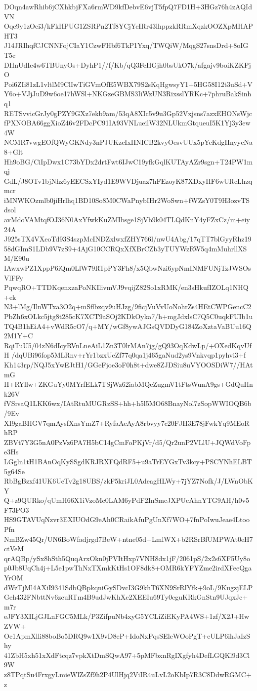 DOqn4awRhib6jCXhkbjFXa6rmWD9kfDebvE6vjT5fpQ7FD1H+3HGz76h4zAQIdVN
Oqc9y1zOci3/kFkHPUG1ZSRPn2Tf8YCjYcIRr43lhppzkRRmXqzkOOZXpMHAPHT3
J14JRIhqfCJCNNFojCIaY1CzwFHbf6TkP1Yxq/TWQiW/MqgS27snsDrd+8oIGT5c
DHnUdIe4w6TBUnyOs+DyhP1//f/Kb/qQ3FeHGjh0bsUkO7k/afgajv9boiKZKPjO
Poi6ZIi81zL1vltlM9ClIwTiGVmOfE5WBX79S2sKqHgwsyY1+5HG58I12t3uSd+V
Y6o+VJjJuD9w6oe17hWSl+NKGzeGBMS3IiWzUN3RixsslYRKc+7phruBakSinhq1
RETSvvicGrJy0gPZY9GXz7ekb9am/53qA8XIc5v9u3Gp52Vxjsns7azxEHONsWjc
fPXNOBA66ggXioZ46v2FDcPC91IA93VNLueilW32NLUkmGtqueuI5K1Yj3y3ew4W
NCMR7vwgEOfQWyGKNdy3nPJUKzcIxHNICB2kvyOesvUUx5pYeKdgHnyycNa8+Glt
Hh9oBG/CiIpDwx1C73bYDx2drtFwt6IJwC19yfkGqlKUTAyAZr9sgn+T24PW1mqj
GdL/J8OTv1bjNhz6yEECSxYIyd1E9WVDjuaz7hFEzoyK87XDxyHF6wURcLhzqmcr
iMNWKOzmlb0jiHrlhq1BD10So8M0CWaPnybIHr2WoSwn+fWZsY0T9H3ozvTSdsol
avMdoVAMtqfOJ36N0AxYfwkKuZMIbsge1SjVb9k04TLQdKnY4yFZxCz/m+eiy24A
J925sTX4VXeoTd93S4szpMcINDZxlwxfZHY766l/nwU4Abg/17qTT7blGyyRhz19
58dGImS1LDb9V7zS9+4AjG10CCRQxXfXBrCZb3yTUYWzRW5q4mMuhrllXSM/E90u
IAwxwPZ1XppP6iQm0LlW79RTpPY3Fh8/x5QbwNzi6ypNmINMFUNjTzJWSOsVlFFy
PqwqRO+TTDKqenxzaPoNKIlivmVJ9vqijZ82So1xRMK/en3sHkufIZOLq1NHQ+ek
N3+lMg/IlnWTxa3O2q+mSflbzqv9uHJzg/9ficjVuVvUoNohrZs4HEtCWPGencC2
PbZh6xOLkc5jtg8t285cK7XCT9aSOj2KDkOyka7/h+mgJdxlsC7Q5C0uqkFUIb1u
TQ4B1hEiA4+vWdR5cO7/q+MY/wGf8ywAJGsQVDDyG184ZoXztaVaBUu16Q2M1Y+C
RqiTuU5/04zN6dIcyRVnLneAiL1Zn3T0lrMAn7jg/gQ93OqKdwLp/+OXedKqvUfH
/dqUBi96fop5MLRnv+rYr1bzxUeZf77q0qa1j465gaNud2ys9Vnkvqp1pyhvi3+f
Kh143rp/NQJ5xYwEJtH1/GGeFjoe3oF0h8t+dwe8ZJDSiu8uVYOOSDiW7//HAtmG
H+RYllw+ZKGuYy0MYrfELk7TSjWz62iabMQeZugmV1tFtsWunA9gs+GdQuHnk26V
fVSrsaQ1LKK6wx/IAtRtuMUGRzSS+hh+h5l5MO68BnayNol7zSopWWIOQB6b/9Ev
XI9gaBHGV7qmAysfXnsYmZ7+RyfaAeAyA8rbvyy7c20FJH3E78jFwkYq9MEoRhRP
ZBVt7Y3G5nA0PzVz6PA7H5bC14gCmFoPKjVr/d5/Qr2unP2VLlU+JQWdVoFpe3Hs
LGgln1tH1BAnOqKySSgdKRJRXFQdRF5+u9aTrEYGxTv3kcy+PSCYNhELBT5g64Se
RbBgBzxf41UK6UeTv2g18UBS/zkF5kriJL0AdeagHLWy+7jYZ7Nofk/J/LWnObKY
Q+z9QURko/qUmH66X1iVzoMc0LAM6yPdF2InSmcJXPUcAhnYTG9AH/h0v5F73PO3
HS9GTAVUqNzvr3EXIUOdG9eAh0CRaikAfuPgUnXf7WO+7fnPoIwuJeae4LtooPfn
NmBZw45Qr/UN6BoWfadjrgd7BeW+ntne05d+LmlWX+b2RSrBfUMPWAt0eH7ctVeM
qrAQBp/ySx8hSth5QuqArxOkn0jPVItHxp7VNH8dx1jF/2061pS/2x2s6XF5Uy8o
p0Jb8UqCh4j+L5e1pwThNxTXmkKtHs1OF8dk8+OMR6kYFYZme2irdXFeeQgaYrOM
dWzTjMl4AXiI9341SdbQBpkqniGySDvcI3G9khT6XN9SrRlYfk+9oL/9KugzjELP
Geh432FNbttNv6zcuRTm4B9udJwKhXc2XEEIu69Ty0cguKRkGnStn9UJqxJc+m7r
eJFY3XILjGJLnFGC5MLk/P3ZifpuNb4xyG5YCLiZiEKyPA4WS+1zf/X2J+HwZVW+
Oc1ApmXlli88boBo5DRQ9w1X9vD8eP+IdoNxPqsSEleWOoPgT+eULP6ihJaIzShy
41ZbH5xh51xXdFtcqz7vpkXtDmSQwA97+5pMFbxnRgIXgfyh4DefLGQKl9d3Cl9W
z8TPqtSu4FrxgyLmieWlZsZf9h2P4UlHjq2ViIR4uLvL2oKbIp7R3C8DdwRGMC+z
